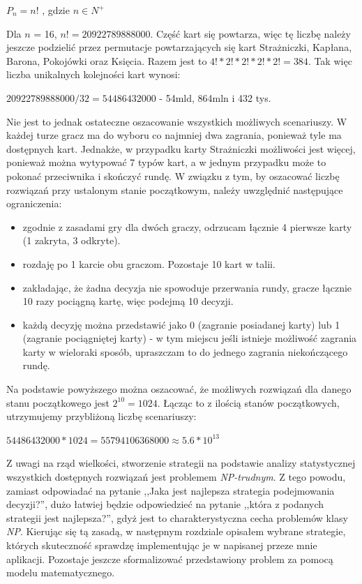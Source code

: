 \begin{center}
	$P_n = n!$ , gdzie $n\in N^+$
\end{center}

Dla  $n$ = 16, $n!=20 922 789 888 000$. Część kart się powtarza, więc tę liczbę należy jeszcze podzielić przez permutacje powtarzających się kart Strażniczki, Kapłana, Barona, Pokojówki oraz Księcia. Razem jest to $4! * 2! * 2! * 2! * 2! =  384$. Tak więc liczba unikalnych kolejności kart wynosi: 

\begin{center}
	$20 922 789 888 000 / 32 = 54486432000$ - 54mld, 864mln i 432 tys.
\end{center}

Nie jest to jednak ostateczne oszacowanie wszystkich możliwych scenariuszy. W każdej turze gracz ma do wyboru co najmniej dwa zagrania, ponieważ tyle ma dostępnych kart. Jednakże, w przypadku karty Strażniczki możliwości jest więcej, ponieważ można wytypować 7 typów kart, a w jednym przypadku może to pokonać przeciwnika i skończyć rundę. W związku z tym, by oszacować liczbę rozwiązań przy ustalonym stanie początkowym, należy uwzględnić następujące ograniczenia:
\begin{itemize}
	\item zgodnie z zasadami gry dla dwóch graczy, odrzucam łącznie 4 pierwsze karty (1 zakryta, 3 odkryte).
	\item rozdaję po 1 karcie obu graczom. Pozostaje 10 kart w talii.
	\item zakładając, że żadna decyzja nie spowoduje przerwania rundy, gracze łącznie 10 razy pociągną kartę, więc podejmą 10 decyzji.
	\item każdą decyzję można przedstawić jako 0 (zagranie posiadanej karty) lub 1 (zagranie pociągniętej karty) - w tym miejscu jeśli istnieje możliwość zagrania karty w wieloraki sposób, upraszczam to do jednego zagrania niekończącego rundę.
\end{itemize}
Na podstawie powyższego można oszacować, że możliwych rozwiązań dla danego stanu początkowego jest $2^{10}=1024$. Łącząc to z ilością stanów początkowych, utrzymujemy przybliżoną liczbę scenariuszy:

\begin{center}
	$54486432000 * 1024 = 55794106368000 \approx  5.6*10^{13}$
\end{center}

Z uwagi na rząd wielkości, stworzenie strategii na podstawie analizy statystycznej wszystkich dostępnych rozwiązań jest problemem \textit{NP-trudnym}. Z tego powodu, zamiast odpowiadać na pytanie ,,Jaka jest najlepsza strategia podejmowania decyzji?'', dużo łatwiej będzie odpowiedzieć na pytanie ,,która z podanych strategii jest najlepsza?'', gdyż jest to charakterystyczna cecha problemów klasy \textit{NP}. Kierując się tą zasadą, w następnym rozdziale opisałem wybrane strategie, których skuteczność sprawdzę implementując je w napisanej przeze mnie aplikacji. Pozostaje jeszcze sformalizować przedstawiony problem za pomocą modelu matematycznego.


